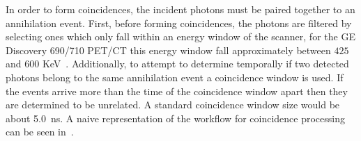                 In order to form coincidences, the incident photons must be paired together to an annihilation event. First, before forming coincidences, the photons are filtered by selecting ones which only fall within an energy window of the scanner, for the \gls{GE} Discovery 690/710 \gls{PET}/\gls{CT} this energy window fall approximately between $425$ and $600$ \gls{KeV}~. Additionally, to attempt to determine temporally if two detected photons belong to the same annihilation event a coincidence window is used. If the events arrive more than the time of the coincidence window apart then they are determined to be unrelated. A standard coincidence window size would be about \SI{5.0}{\nano\second}. A naive representation of the workflow for coincidence processing can be seen in~.
            
